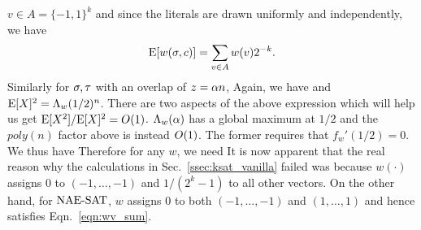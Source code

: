 \documentclass[letterpaper, 10pt, twocolumn, reqno]{amsart}
\begin{document}
$v \in A = \{-1,1\}^k$ and since the literals are drawn uniformly and independently, we have
$$
\textrm{E}[w(\sigma,c)] = \sum_{v \in A} w(v) 2^{-k}.
$$
Similarly for $\sigma, \tau$ with an overlap of $z =\alpha n$,
Again, we have
and $\textrm{E}[X]^2 = \Lambda_w(1/2)^n$. There are two aspects of the above expression which will help us get $\textrm{E}[X^2]/\textrm{E}[X]^2 = O(1)$. $\Lambda_w(\alpha)$ has a global maximum at $1/2$ and the $poly(n)$ factor above is instead $O(1)$. The former requires that $f_w'(1/2) =0$. We thus have
Therefore for any $w$, we need
It is now apparent that the real reason why the calculations in Sec.~\ref{ssec:ksat_vanilla} failed was because $w(\cdot)$ assigns 0 to $(-1,\ldots,-1)$ and $1/(2^k-1)$ to all other vectors. On the other hand, for $\textrm{NAE-SAT}$, $w$ assigns 0 to both $(-1,\ldots,-1)$ and $(1,\ldots,1)$ and hence satisfies Eqn.~\eqref{eqn:wv_sum}.



{
\small


}
\end{document}
